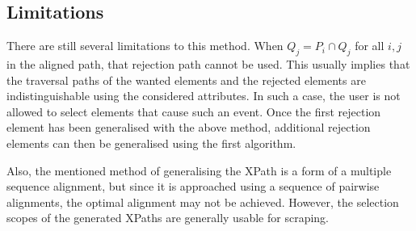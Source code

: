 \subsection{Limitations}
There are still several limitations to this method. When $Q_j = P_i \cap Q_j$ for all $i,j$ in the aligned path, that rejection path cannot be used. This usually implies that the traversal paths of the wanted elements and the rejected elements are indistinguishable using the considered attributes. In such a case, the user is not allowed to select elements that cause such an event. Once the first rejection element has been generalised with the above method, additional rejection elements can then be generalised using the first algorithm.

Also, the mentioned method of generalising the XPath is a form of a multiple sequence alignment, but since it is approached using a sequence of pairwise alignments, the optimal alignment may not be achieved. However, the selection scopes of the generated XPaths are generally usable for scraping.


